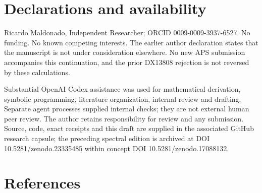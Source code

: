 \documentclass[
  10pt,
]{article}
\begin{document}
\section{Declarations and
availability}\label{declarations-and-availability}

Ricardo Maldonado, Independent Researcher; ORCID 0009-0009-3937-6527. No
funding. No known competing interests. The earlier author declaration
states that the manuscript is not under consideration elsewhere. No new
APS submission accompanies this continuation, and the prior DX13808
rejection is not reversed by these calculations.

Substantial OpenAI Codex assistance was used for mathematical
derivation, symbolic programming, literature organization, internal
review and drafting. Separate agent processes supplied internal checks;
they are not external human peer review. The author retains
responsibility for review and any submission. Source, code, exact
receipts and this draft are supplied in the associated GitHub research
capsule; the preceding spectral edition is archived at DOI
10.5281/zenodo.23335485 within concept DOI 10.5281/zenodo.17088132.

\section{References}\label{references}
\end{document}
